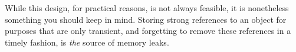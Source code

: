 While this design, for practical reasons, is not always feasible, it is
nonetheless something you should keep in mind. Storing strong references to an
object for purposes that are only transient, and forgetting to remove these
references in a timely fashion, is \emph{the} source of memory leaks.

